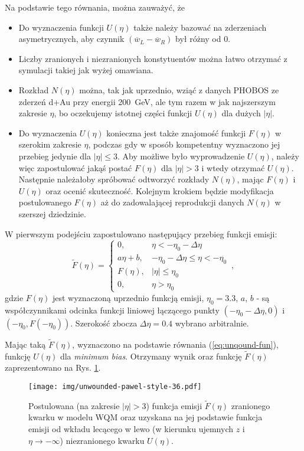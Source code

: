\documentclass[a4paper,12pt]{article}
\begin{document}
Na podstawie tego równania, można zauważyć, że
\begin{itemize}
	\item Do wyznaczenia funkcji $U(\eta)$ także należy bazować na zderzeniach asymetrycznych, aby czynnik $(\overline{w}_L - \overline{w}_R)$ był różny od 0.
	\item Liczby zranionych i niezranionych konstytuentów można łatwo otrzymać z symulacji takiej jak wyżej omawiana.
	\item Rozkład $N(\eta)$ można, tak jak uprzednio, wziąć z danych PHOBOS ze zderzeń d+Au przy energii 200~GeV, ale tym razem w jak najszerszym zakresie $\eta$, bo oczekujemy istotnej części funkcji $U(\eta)$ dla dużych $|\eta|$.
	\item Do wyznaczenia $U(\eta)$ konieczna jest także znajomość funkcji $F(\eta)$ w szerokim zakresie $\eta$, podczas gdy w sposób kompetentny wyznaczono jej przebieg jedynie dla $|\eta| \le 3$. Aby możliwe było wyprowadzenie $U(\eta)$, należy więc zapostulować jakąś postać $F(\eta)$ dla $|\eta| > 3$ i wtedy otrzymać $U(\eta)$. Następnie należałoby spróbować odtworzyć rozkłady $N(\eta)$, mając $F(\eta)$ i $U(\eta)$ oraz ocenić skuteczność. Kolejnym krokiem będzie modyfikacja postulowanego $F(\eta)$ aż do zadowalającej reprodukcji danych $N(\eta)$ w szerszej dziedzinie.
\end{itemize}

W pierwszym podejściu zapostulowano następujący przebieg funkcji emisji:
\begin{equation}
\widetilde{F}(\eta) = 
	\begin{cases} 
		0, &\eta < -\eta_0 - \Delta\eta \\
		a\eta + b, &-\eta_0 - \Delta\eta \le \eta < -\eta_0 \\
		F(\eta), &|\eta| \le \eta_0 \\
		0, &\eta > \eta_0
	\end{cases}\,,
\end{equation}
gdzie $F(\eta)$ jest wyznaczoną uprzednio funkcją emisji, $\eta_0 = 3.3$, $a$, $b$ - są współczynnikami odcinka funkcji liniowej łączącego punkty $(-\eta_0 - \Delta\eta, 0)$ i $(-\eta_0, F(-\eta_0))$. Szerokość zbocza $\Delta\eta = 0.4$ wybrano arbitralnie.

Mając taką $\widetilde{F}(\eta)$, wyznaczono na podstawie równania (\ref{eq:unqound-fun}), funkcję $U(\eta)$ dla \textit{minimum bias}. Otrzymany wynik oraz funkcję $\widetilde{F}(\eta)$ zaprezentowano na Rys. \ref{fig:unwound-fun}.

\begin{figure}[H]
	\begin{center}
	\texttt{[image: img/unwounded-pawel-style-36.pdf]}
	\vspace{-0.1in}
		\caption{ Postulowana (na zakresie $|\eta| > 3$) funkcja emisji $\widetilde{F}(\eta)$ zranionego kwarku w modelu WQM  oraz uzyskana na jej podstawie funkcja emisji od wkładu lecącego w lewo (w kierunku ujemnych $z$ i $\eta \to -\infty$) niezranionego kwarku $U(\eta)$.} \label{fig:unwound-fun}
	\end{center}
\end{figure}
\end{document}
